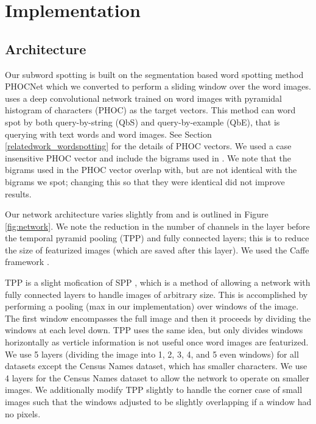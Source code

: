\documentclass[ms,electronic,twosidetoc,letterpaper,chaptercenter,parttop,lol,lof,lot]{byumsphd}
\begin{document}
\section{Implementation}

\subsection{Architecture}

Our subword spotting is built on the segmentation based word spotting method PHOCNet \cite{sudholt2016 sudholt2017} which we converted to perform a sliding window over the word images. \cite{sudholt2017} uses a deep convolutional network trained on word images with pyramidal histogram of characters (PHOC) \cite{Almazan2014} as the target vectors. This method can word spot by both query-by-string (QbS) and query-by-example (QbE), that is querying with text words and word images. See Section \ref{relatedwork_wordspotting} for the details of PHOC vectors. We used a case insensitive PHOC vector and include the bigrams used in \cite{sudholt2016}. We note that the bigrams used in the PHOC vector overlap with, but are not identical with the bigrams we spot; changing this so that they were identical did not improve results. 



Our network architecture varies slightly from \cite{sudholt2017} and is outlined in Figure \ref{fig:network}. We note the reduction in the number of channels in the layer before the temporal pyramid pooling (TPP) and fully connected layers; this is to reduce the size of featurized images (which are saved after this layer).  We used the Caffe framework \cite{caffe}.


TPP is a slight mofication of SPP \cite{SPP}, which is a method of allowing a network with fully connected layers to handle images of arbitrary size. This is accomplished by performing a pooling (max in our implementation) over windows of the image. The first window encompasses the full image and then it proceeds by dividing the windows at each level down. TPP uses the same idea, but only divides windows horizontally as verticle information is not useful once word images are featurized. We use 5 layers (dividing the image into 1, 2, 3, 4, and 5 even windows) for all datasets except the Census Names dataset, which has smaller characters. We use 4 layers for the Census Names dataset to allow the network to operate on smaller images. We additionally modify TPP slightly to handle the corner case of small images such that the windows adjusted to be slightly overlapping if a window had no pixels.
\end{document}
